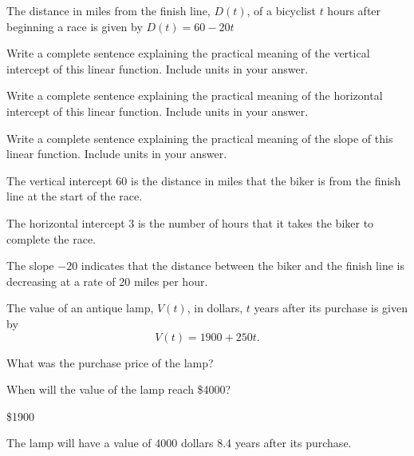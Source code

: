 \begin{exercise}
The distance in miles from the finish line, $D(t)$, of a bicyclist $t$ hours after beginning a race is given by $D(t)=60-20t$
    \begin{parts}
        \item Write a complete sentence explaining the practical meaning of the vertical intercept of this linear function. Include units in your answer.

        \item Write a complete sentence explaining the practical meaning of the horizontal intercept of this linear function. Include units in your answer.

        \item Write a complete sentence explaining the practical meaning of the slope of this linear function. Include units in your answer.
    \end{parts}
\end{exercise}

\begin{solution}
\begin{parts}
    \item The vertical intercept 60 is the distance in miles that the biker is from the finish line at the start of the race.

    \item The horizontal intercept 3 is the number of hours that it takes the biker to complete the race.

    \item The slope $-20$ indicates that the distance between the biker and the finish line is decreasing at a rate of 20 miles per hour.
\end{parts}
\end{solution}



\begin{exercise}
The value of an antique lamp, $V(t)$, in dollars, $t$ years after its purchase is given by
\[
V(t)=1900+250t.
\]

\begin{parts}
\item What was the purchase price of the lamp?

\item When will the value of the lamp reach \$4000?
\end{parts}
\end{exercise}


\begin{solution}
\begin{parts}
    \item \$1900
    \item The lamp will have a value of 4000 dollars 8.4 years after its purchase.
\end{parts}
\end{solution}



